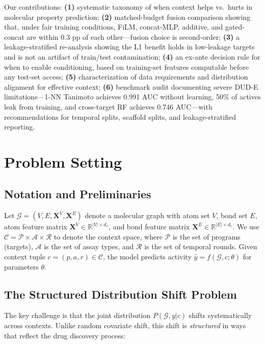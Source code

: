 \documentclass{article}
\begin{document}
Our contributions: \textbf{(1)} systematic taxonomy of when context helps vs.\ hurts in molecular property prediction; \textbf{(2)} matched-budget fusion comparison showing that, under fair training conditions, FiLM, concat-MLP, additive, and gated-concat are within 0.3 pp of each other---fusion choice is second-order; \textbf{(3)} a leakage-stratified re-analysis showing the L1 benefit holds in low-leakage targets and is not an artifact of train/test contamination; \textbf{(4)} an ex-ante decision rule for when to enable conditioning, based on training-set features computable before any test-set access; \textbf{(5)} characterization of data requirements and distribution alignment for effective context; \textbf{(6)} benchmark audit documenting severe DUD-E limitations---1-NN Tanimoto achieves 0.991 AUC without learning, 50\% of actives leak from training, and cross-target RF achieves 0.746 AUC---with recommendations for temporal splits, scaffold splits, and leakage-stratified reporting.

\section{Problem Setting}
\label{sec:problem}

\subsection{Notation and Preliminaries}

Let $\mathcal{G} = (V, E, \mathbf{X}^V, \mathbf{X}^E)$ denote a molecular graph with atom set $V$, bond set $E$, atom feature matrix $\mathbf{X}^V \in \mathbb{R}^{|V| \times d_v}$, and bond feature matrix $\mathbf{X}^E \in \mathbb{R}^{|E| \times d_e}$. We use $\mathcal{C} = \mathcal{P} \times \mathcal{A} \times \mathcal{R}$ to denote the context space, where $\mathcal{P}$ is the set of programs (targets), $\mathcal{A}$ is the set of assay types, and $\mathcal{R}$ is the set of temporal rounds. Given context tuple $c = (p, a, r) \in \mathcal{C}$, the model predicts activity $\hat{y} = f(\mathcal{G}, c; \theta)$ for parameters $\theta$.

\subsection{The Structured Distribution Shift Problem}

The key challenge is that the joint distribution $P(\mathcal{G}, y | c)$ shifts systematically across contexts. Unlike random covariate shift, this shift is \textit{structured} in ways that reflect the drug discovery process:
\end{document}
